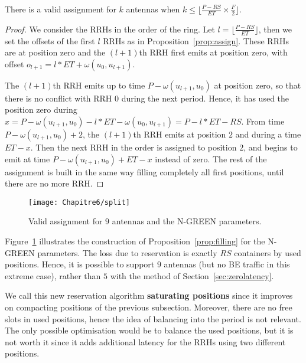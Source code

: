 \begin{proposition}\label{prop:filling}
 There is a valid assignment for $k$ antennas when $k \leq \lfloor \frac{P- RS}{ET} \times \frac{F}{2}\rfloor$.
\end{proposition}
\begin{proof}
 We consider the RRHs in the order of the ring.
 Let $l = \lfloor \frac{P- RS}{ET}\rfloor$, then we set the offsets of the first $l$ RRHs as in Proposition~\ref{prop:assign}. These RRHs are at position zero and the $(l+1)$th RRH first emits at position zero, with offset $o_{l+1} = l*ET + \omega(u_0,u_{l+1})$. 
 
 The $(l+1)$th RRH emits up to time $P - \omega(u_{l+1},u_{0})$ at position zero, so that there is no conflict with RRH $0$ during the next period.
 Hence, it has used the position zero during $x = P - \omega(u_{l+1},u_{0}) - l*ET - \omega(u_0,u_{l+1}) = P - l*ET - RS$. From time $P - \omega(u_{l+1},u_{0}) + 2$, the $(l+1)$th RRH emits at position $2$ and during a time $ET - x$. Then the next RRH in the order is assigned to position $2$, and begins to emit at time $P - \omega(u_{l+1},u_{0}) + ET -x$ instead of zero. The rest of the assignment is built in the same way filling completely all first positions, until there are no more RRH.  
\end{proof}
 
\begin{figure}[h]
\begin{center}   

      \texttt{[image: Chapitre6/split]}
     \caption{Valid assignment for $9$ antennas and the N-GREEN parameters.}   \label{fig:split}
\end{center}
  \end{figure}
  
  
Figure~\ref{fig:split} illustrates the construction of Proposition~\ref{prop:filling} for the N-GREEN parameters. The loss due to reservation is exactly $RS$ containers by used positions. Hence, it is possible to support $9$ antennas (but no BE traffic in this extreme case), rather than $5$ with the method of Section~\ref{sec:zerolatency}.


 We call this new reservation algorithm \textbf{saturating positions} since it improves on compacting positions of the previous subsection. Moreover, there are no free slots in used positions, hence the idea of balancing into the period is not relevant. The only possible optimisation would be to balance the used positions, but it is not worth it since it adds additional latency for the RRHs using two different positions. 
%  


